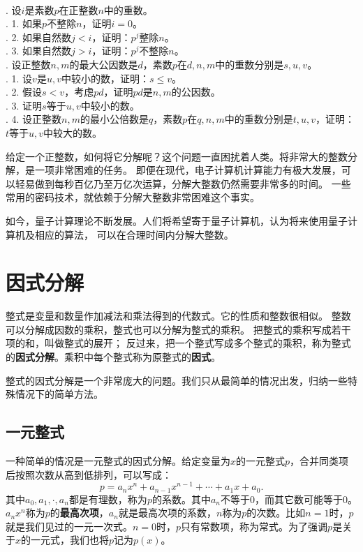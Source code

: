 \documentclass[12pt,UTF8,fontset=none]{ctexbook}
\begin{document}
\begin{xt}\label{xt:1-1-1}
    \mbox{}\\
    . 设$i$是素数$p$在正整数$n$中的重数。\\
    . 1. 如果$p$不整除$n$，证明$i = 0$。\\
    . 2. 如果自然数$j < i$，证明：$p^j$整除$n$。\\
    . 3. 如果自然数$j > i$，证明：$p^j$不整除$n$。\\
    . 设正整数$n,m$的最大公因数是$d$，素数$p$在$d,n,m$中的重数分别是$s,u,v$。\\
    . 1. 设$v$是$u,v$中较小的数，证明：$s \leqslant v$。\\
    . 2. 假设$s < v$，考虑$pd$，证明$pd$是$n,m$的公因数。\\
    . 3. 证明$s$等于$u,v$中较小的数。 \\
    . 4. 设正整数$n,m$的最小公倍数是$q$，素数$p$在$q,n,m$中的重数分别是$t,u,v$，证明：$t$等于$u,v$中较大的数。\\
\end{xt}

给定一个正整数，如何将它分解呢？这个问题一直困扰着人类。将非常大的整数分解，是一项非常困难的任务。
即便在现代，电子计算机计算能力有极大发展，可以轻易做到每秒百亿乃至万亿次运算，分解大整数仍然需要非常多的时间。
一些常用的密码技术，就依赖于分解大整数非常困难这个事实。

如今，量子计算理论不断发展。人们将希望寄于量子计算机，认为将来使用量子计算机及相应的算法，
可以在合理时间内分解大整数。

\chapter{因式分解}
整式是变量和数量作加减法和乘法得到的代数式。它的性质和整数很相似。
整数可以分解成因数的乘积，整式也可以分解为整式的乘积。
把整式的乘积写成若干项的和，叫做整式的展开；
反过来，把一个整式写成多个整式的乘积，称为整式的\textbf{因式分解}。乘积中每个整式称为原整式的\textbf{因式}。

整式的因式分解是一个非常庞大的问题。我们只从最简单的情况出发，归纳一些特殊情况下的简单方法。

\section{一元整式}
一种简单的情况是一元整式的因式分解。给定变量为$x$的一元整式$p$，合并同类项后按照次数从高到低排列，可以写成：
$$ p = a_nx^n + a_{n-1}x^{n-1} + \cdots + a_1 x + a_0.$$
其中$a_0, a_1, \cdot , a_n$都是有理数，称为$p$的系数。其中$a_n$不等于$0$，而其它数可能等于$0$。
$a_nx^n$称为$p$的\textbf{最高次项}，$a_n$就是最高次项的系数，$n$称为$p$的次数。比如$n=1$时，$p$
就是我们见过的一元一次式。$n=0$时，$p$只有常数项，称为常式。为了强调$p$是关于$x$的一元式，我们也将$p$记为$p(x)$。
\end{document}
